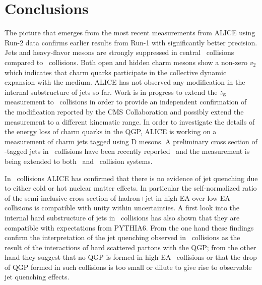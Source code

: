 \documentclass[10pt]{article}
\begin{document}

\section{Conclusions}
The picture that emerges from the most recent measurements from ALICE using Run-2 data confirms earlier results from Run-1 with significantly better precision.
Jets and heavy-flavor mesons are strongly suppressed in central \PbPb\ collisions compared to \pp\ collisions. Both open and hidden charm mesons show a non-zero $v_2$ which indicates 
that charm quarks participate in the collective dynamic expansion with the medium.
ALICE has not observed any modification in the internal substructure of jets so far. Work is in progress to extend the $z_{\rm g}$ measurement to \PbPb\ collisions
in order to provide an independent confirmation of the modification reported by the CMS Collaboration and possibly extend the measurement to a different kinematic range.
In order to investigate the details of the energy loss of charm quarks in the QGP, ALICE is working on a measurement of charm jets tagged using D mesons.
A preliminary cross section of \Dzero-tagged jets in \pp\ collisions have been recently reported~\cite{Aiola:2017} and the measurement is being extended to both \pPb\ and \PbPb\ collision systems.

In \pPb\ collisions ALICE has confirmed that there is no evidence of jet quenching due to either cold or hot nuclear matter effects.
In particular the self-normalized ratio of the semi-inclusive cross section of hadron+jet in high EA over low EA collisions is compatible with unity within uncertainties.
A first look into the internal hard substructure of jets in \pPb\ collisions has also shown that they are compatible with expectations from PYTHIA6.
From the one hand these findings confirm the interpretation of the jet quenching observed in \PbPb\ collisions as the result of the interactions of hard scattered partons
with the QGP; from the other hand they suggest that no QGP is formed in high EA \pPb\ collisions or that the drop of QGP formed in such collisions is too small or dilute to give rise to observable jet quenching effects.
 
\end{document}

